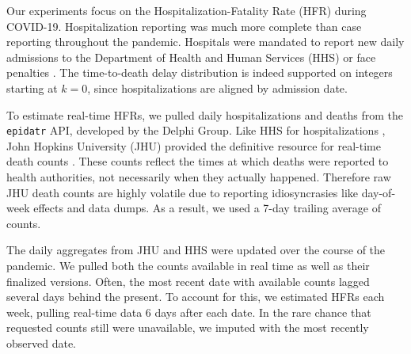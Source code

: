 \documentclass{article}
\begin{document}
Our experiments focus on the Hospitalization-Fatality Rate (HFR) during COVID-19. Hospitalization reporting was much more complete than case reporting throughout the pandemic. Hospitals were mandated to report new daily admissions to the Department of Health and Human Services (HHS) or face penalties \cite{HHS2023}. The time-to-death delay distribution is indeed supported on integers starting at $k=0$, since hospitalizations are aligned by admission date.


To estimate real-time HFRs, we pulled daily hospitalizations and deaths from the \texttt{epidatr} API, developed by the Delphi Group. Like HHS for hospitalizations \cite{HHS2023}, John Hopkins University (JHU) provided the definitive resource for real-time death counts \cite{JHUepidatr}. These counts reflect the times at which deaths were reported to health authorities, not necessarily when they actually happened. Therefore raw JHU death counts are highly volatile due to reporting idiosyncrasies like day-of-week effects and data dumps. As a result, we used a 7-day trailing average of counts. 

The daily aggregates from JHU and HHS were updated over the course of the pandemic. We pulled both the counts available in real time as well as their finalized versions. Often, the most recent date with available counts lagged several days behind the present. To account for this, we estimated HFRs each week, pulling real-time data 6 days after each date. In the rare chance that requested counts still were unavailable, we imputed with the most recently observed date.

\end{document}
